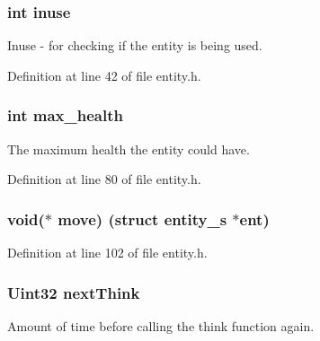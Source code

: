\subsubsection[{inuse}]{\setlength{\rightskip}{0pt plus 5cm}int inuse}\label{structentity__s_a679cabe3b846f2e363f43d8e57433834}


Inuse -\/ for checking if the entity is being used. 



Definition at line 42 of file entity.\+h.

\hypertarget{structentity__s_ae7fb049f4b5173a202e774b3eb3e64e4}{}
\subsubsection[{max\+\_\+health}]{\setlength{\rightskip}{0pt plus 5cm}int max\+\_\+health}\label{structentity__s_ae7fb049f4b5173a202e774b3eb3e64e4}


The maximum health the entity could have. 



Definition at line 80 of file entity.\+h.

\hypertarget{structentity__s_ac02404c3a0246eb63f2a8363f453c2e5}{}
\subsubsection[{move}]{\setlength{\rightskip}{0pt plus 5cm}void($\ast$ move) (struct {\bf entity\+\_\+s} $\ast$ent)}\label{structentity__s_ac02404c3a0246eb63f2a8363f453c2e5}


Definition at line 102 of file entity.\+h.

\hypertarget{structentity__s_a135cb0ebb9e7e91c5de82eaa033e4c60}{}
\subsubsection[{next\+Think}]{\setlength{\rightskip}{0pt plus 5cm}Uint32 next\+Think}\label{structentity__s_a135cb0ebb9e7e91c5de82eaa033e4c60}


Amount of time before calling the think function again. 



